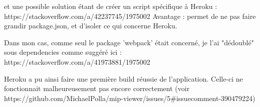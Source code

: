 et une possible solution étant de créer un script spécifique à Heroku : https://stackoverflow.com/a/42237745/1975002
Avantage : permet de ne pas faire grandir package.json, et d'isoler ce qui concerne Heroku.

Dans mon cas, comme seul le package 'webpack' était concerné, je l'ai "dédoublé" sous dependencies comme suggéré ici : https://stackoverflow.com/a/41973881/1975002

Heroku a pu ainsi faire une première build réussie de l'application. Celle-ci ne fonctionnait malheureusement pas encore correctement (voir https://github.com/MichaelPolla/mip-viewer/issues/5#issuecomment-390479224) 
